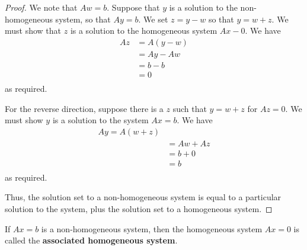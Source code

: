 \documentclass{article}
\begin{document}
\begin{proof}
  We note that $Aw = b$.
  Suppose that $y$ is a solution to the non-homogeneous system, so that $Ay = b$. We set $z = y - w$ so that $y = w + z$. We must show that $z$ is a solution to the homogeneous system $Ax - 0$. We have
  \begin{align*}
    Az &= A(y-w)\\
    &= Ay - Aw\\
    &= b - b\\
    &= 0\\
  \end{align*}
  as required.

  For the reverse direction, suppose there is a $z$ such that $y = w+z$ for $Az = 0$. We must show $y$ is a solution to the system $Ax =b$. We have
  \begin{align*}
    Ay = A(w+z)\\
    &= Aw + Az\\
    &= b + 0\\
    &= b\\
  \end{align*} as required.

  Thus, the solution set to a non-homogeneous system is equal to a particular solution to the system, plus the solution set to a homogeneous system.
\end{proof}
\begin{definition}
  If $Ax = b$ is a non-homogeneous system, then the homogeneous system $Ax = 0$ is called the \textbf{associated homogeneous system}.
\end{definition}
\end{document}
